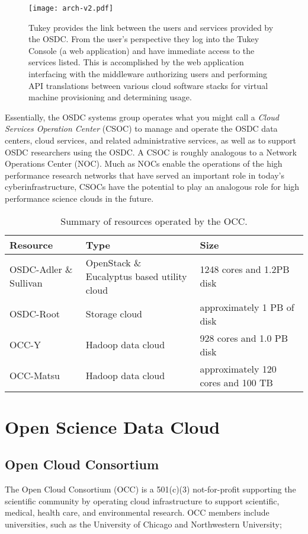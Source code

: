 \documentclass[11pt,twocolumn]{article}
\newcommand{\ph}[1]{\medbreak \noindent {\bf #1}}
\begin{document}
\begin{figure}[ht]
\centering
\texttt{[image: arch-v2.pdf]}
\caption{Tukey provides the link between the users and services
  provided by the OSDC.  From the user's perspective they log into the
  Tukey Console (a web application) and have immediate access to the services
listed. This is accomplished by the web application
  interfacing with the middleware authorizing users and performing API
  translations between various cloud software stacks for virtual
  machine provisioning and determining usage.}
\label{figure:arch}
\end{figure}


\ph{CSOC.}  Essentially, the OSDC systems group operates what you
might call a {\em Cloud Services Operation Center} (CSOC) to manage
and operate the OSDC data centers, cloud services, and related
administrative services, as well as to support OSDC researchers using
the OSDC.  A CSOC is roughly analogous to a Network Operations Center
(NOC).  Much as NOCs enable the operations of the high performance
research networks that have served an important role in today's
cyberinfrastructure, CSOCs have the potential to play an analogous role 
for high performance science clouds in the future.


\begin{table*}[ht]
\begin{center}
\begin{tabular}{|p{2.0in}|p{2.0in}|p{2.0in}|} \hline
{\bf Resource} & {\bf Type} & {\bf Size} \\ \hline
OSDC-Adler \& Sullivan & OpenStack \& Eucalyptus based utility cloud & 1248 cores and 1.2PB
disk  \\ \hline
OSDC-Root & Storage cloud & approximately 1 PB of disk \\ \hline
OCC-Y & Hadoop data cloud & 928 cores and 1.0 PB disk \\ \hline
OCC-Matsu & Hadoop data cloud & approximately 120 cores and 100 TB \\ \hline
\end{tabular}
\end{center}
\caption{Summary of resources operated by the OCC.}
\label{table:occ-resources}
\end{table*}

\section{Open Science Data Cloud}

\subsection{Open Cloud Consortium}  The Open Cloud Consortium (OCC) is a
501(c)(3) not-for-profit supporting the scientific community by
operating cloud infrastructure to support scientific, medical,  health
care, and environmental research.  OCC members include universities,
such as the University of Chicago and Northwestern University;
\end{document}
